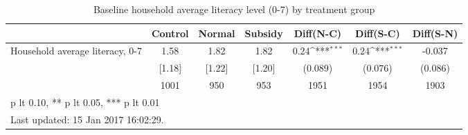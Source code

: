 \begin{table}[htbp]\centering
\def\sym#1{\ifmmode^{#1}\else\(^{#1}\)\fi}
\caption{Baseline household average literacy level (0-7) by treatment group \label{tab:"balance"}}
\begin{tabular*}{1\hsize}{@{\hskip\tabcolsep\extracolsep\fill}l*{1}{cccccc}}
\toprule
                                &  Control&   Normal&  Subsidy&Diff(N-C)         &Diff(S-C)         &Diff(S-N)         \\
\midrule
Household average literacy, 0-7 &     1.58&     1.82&     1.82&     0.24\sym{***}&     0.24\sym{***}&   -0.037         \\
                                &   [1.18]&   [1.22]&   [1.20]&  (0.089)         &  (0.076)         &  (0.086)         \\
                                &     1001&      950&      953&     1951         &     1954         &     1903         \\
\bottomrule
\multicolumn{7}{l}{\footnotesize * p lt 0.10, ** p lt 0.05, *** p lt 0.01}\\
\multicolumn{7}{l}{\footnotesize Last updated: 15 Jan 2017 16:02:29.}\\
\end{tabular*}
\end{table}

